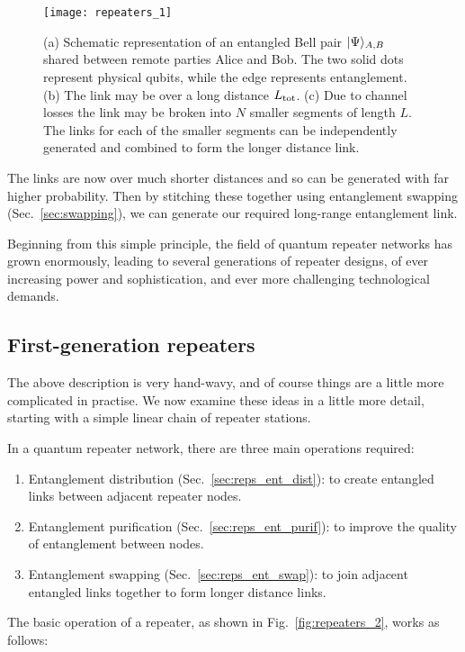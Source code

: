 \begin{figure}[!htbp]
\texttt{[image: repeaters\_1]}
\captionspacefig \caption{(a) Schematic representation of an entangled Bell pair $|\Psi\rangle_{A,B}$ shared between remote parties Alice and Bob. The two solid dots represent physical qubits, while the edge represents entanglement. (b) The link may be over a long distance $L_{\rm tot}$. (c) Due to channel losses the link may be broken into $N$ smaller segments of length $L$. The links for each of the smaller segments can be independently generated and combined to form the longer distance link.} 
\label{fig:repeaters_1}
\end{figure} 

The links are now over much shorter distances and so can be generated with far higher probability. Then by stitching these together using entanglement swapping (Sec.~\ref{sec:swapping}), we can generate our required long-range entanglement link.

Beginning from this simple principle, the field of quantum repeater networks has grown enormously, leading to several generations of repeater designs, of ever increasing power and sophistication, and ever more challenging technological demands.

\subsection{First-generation repeaters}

The above description is very hand-wavy, and of course things are a little more complicated in practise. We now examine these ideas in a little more detail, starting with a simple linear chain of repeater stations. 

In a quantum repeater network, there are three main operations required:
\begin{enumerate}
\item Entanglement distribution (Sec.~\ref{sec:reps_ent_dist}): to create entangled links between adjacent repeater nodes.
\item Entanglement purification (Sec.~\ref{sec:reps_ent_purif}): to improve the quality of entanglement between nodes.
\item Entanglement swapping (Sec.~\ref{sec:reps_ent_swap}): to join adjacent entangled links together to form longer distance links.
\end{enumerate}
The basic operation of a repeater, as shown in Fig.~\ref{fig:repeaters_2}, works as follows:

